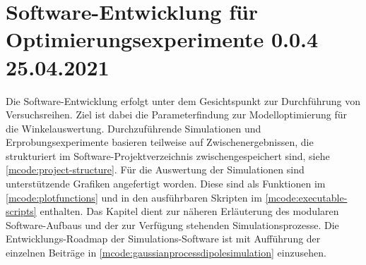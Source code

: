 %

\chapter{Software-Entwicklung für Optimierungsexperimente 0.0.4 25.04.2021}\label{ch:sw-entwicklung-f-opt-exp}


Die Software-Entwicklung erfolgt unter dem Gesichtspunkt zur Durchführung von Versuchsreihen. Ziel ist dabei die Parameterfindung zur Modelloptimierung für die Winkelauswertung. Durchzuführende Simulationen und  Erprobungsexperimente basieren teilweise auf Zwischenergebnissen, die strukturiert im Software-Projektverzeichnis zwischengespeichert sind, siehe \autoref{mcode:project-structure}. Für die Auswertung der Simulationen sind unterstützende Grafiken angefertigt worden. Diese sind als Funktionen im \autoref{mcode:plotfunctions} und in den ausführbaren Skripten im \autoref{mcode:executable-scripts} enthalten. Das Kapitel dient zur näheren Erläuterung des modularen Software-Aufbaus und der zur Verfügung stehenden Simulationsprozesse. Die Entwicklungs-Roadmap der Simulations-Software ist mit Aufführung der einzelnen Beiträge in \autoref{mcode:gaussianprocessdipolesimulation} einzusehen.



